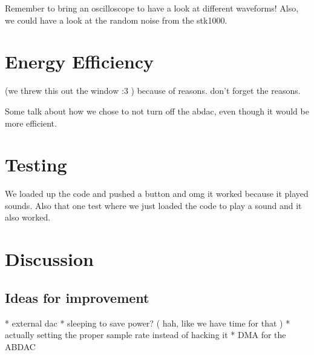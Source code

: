 

Remember to bring an oscilloscope to have a look at different waveforms! Also, we could have a look at the random noise from the stk1000.

\section{Energy Efficiency}

(we threw this out the window :3 )
because of reasons. don't forget the reasons.

Some talk about how we chose to not turn off the abdac, even though it would be more efficient.


\section{Testing}
We loaded up the code and pushed a button and omg it worked because it played sounds.
Also that one test where we just loaded the code to play a sound and it also worked.


\section{Discussion}

\subsection{Ideas for improvement}

* external dac
* sleeping to save power? ( hah, like we have time for that )
* actually setting the proper sample rate instead of hacking it
* DMA for the ABDAC

